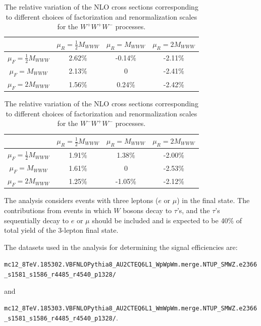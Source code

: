 \begin{table}[ht!]
    \centering
\begin{tabular}{c|c|c|c}
\hline
     & $\mu_R=\frac{1}{2}M_{WWW}$ & $\mu_R=M_{WWW}$ &  $\mu_R=2M_{WWW}$ \\
\hline
$\mu_F=\frac{1}{2}M_{WWW}$ & 2.62\% & -0.14\% & -2.11\% \\
\hline
$\mu_F=M_{WWW}$ & 2.13\% & 0 & -2.41\% \\
\hline
$\mu_F=2M_{WWW}$ & 1.56\% & 0.24\% & -2.42\% \\
\hline
\end{tabular}
\caption{The relative variation of the NLO cross sections corresponding to different choices of factorization and renormalization scales for the $W^+W^+W^-$ processes. }
\label{tab:scaleVariation1}
\end{table}


\begin{table}[ht!]
    \centering
	
\begin{tabular}{c|c|c|c}
\hline
     & $\mu_R=\frac{1}{2}M_{WWW}$ & $\mu_R=M_{WWW}$ &  $\mu_R=2M_{WWW}$ \\
\hline
$\mu_F=\frac{1}{2}M_{WWW}$ & 1.91\% & 1.38\% & -2.00\% \\
\hline
$\mu_F=M_{WWW}$ & 1.61\% & 0 & -2.53\% \\
\hline
$\mu_F=2M_{WWW}$ & 1.25\% & -1.05\% & -2.12\% \\
\hline
\end{tabular}
\caption{The relative variation of the NLO cross sections corresponding to different choices of factorization and renormalization scales for the $W^-W^+W^-$ processes. }
\label{tab:scaleVariation2}
\end{table}



The analysis considers events
with three leptons ($e$ or $\mu$) in the final state. The contributions from events in which $W$ bosons decay to $\tau$'s, and the $\tau$'s sequentially decay to
$e$ or $\mu$ should be included and is expected to be 40\% of total yield of the 3-lepton final state.  

The datasets used in the analysis for determining the signal efficiencies are:\newline
\begin{footnotesize}
\texttt{mc12\_8TeV.185302.VBFNLOPythia8\_AU2CTEQ6L1\_WpWpWm.merge.NTUP\_SMWZ.e2366\_s1581\_s1586\_r4485\_r4540\_p1328/} 
\end{footnotesize}
 and  \newline
 \begin{footnotesize}
\texttt{mc12\_8TeV.185303.VBFNLOPythia8\_AU2CTEQ6L1\_WmWpWm.merge.NTUP\_SMWZ.e2366\_s1581\_s1586\_r4485\_r4540\_p1328/}.\newline
\end{footnotesize}

